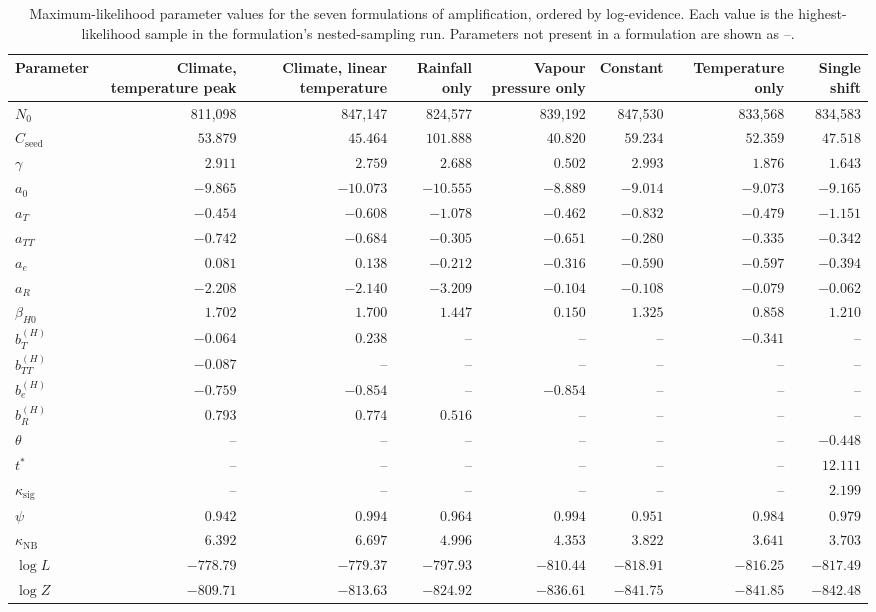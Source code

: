 \begin{table}[ht]
\centering
\scriptsize
\caption{Maximum-likelihood parameter values for the seven formulations of amplification, ordered by log-evidence. Each value is the highest-likelihood sample in the formulation's nested-sampling run. Parameters not present in a formulation are shown as --.}
\label{tab:si_best_fit_parameters}
\begin{tabular}{lrrrrrrr}
\toprule
Parameter & Climate, temperature peak & Climate, linear temperature & Rainfall only & Vapour pressure only & Constant & Temperature only & Single shift \\
\midrule
$N_0$ & 811,098 & 847,147 & 824,577 & 839,192 & 847,530 & 833,568 & 834,583 \\
$C_{\mathrm{seed}}$ & $53.879$ & $45.464$ & $101.888$ & $40.820$ & $59.234$ & $52.359$ & $47.518$ \\
$\gamma$ & $2.911$ & $2.759$ & $2.688$ & $0.502$ & $2.993$ & $1.876$ & $1.643$ \\
$a_0$ & $-9.865$ & $-10.073$ & $-10.555$ & $-8.889$ & $-9.014$ & $-9.073$ & $-9.165$ \\
$a_T$ & $-0.454$ & $-0.608$ & $-1.078$ & $-0.462$ & $-0.832$ & $-0.479$ & $-1.151$ \\
$a_{TT}$ & $-0.742$ & $-0.684$ & $-0.305$ & $-0.651$ & $-0.280$ & $-0.335$ & $-0.342$ \\
$a_e$ & $0.081$ & $0.138$ & $-0.212$ & $-0.316$ & $-0.590$ & $-0.597$ & $-0.394$ \\
$a_R$ & $-2.208$ & $-2.140$ & $-3.209$ & $-0.104$ & $-0.108$ & $-0.079$ & $-0.062$ \\
$\beta_{H0}$ & $1.702$ & $1.700$ & $1.447$ & $0.150$ & $1.325$ & $0.858$ & $1.210$ \\
$b_T^{(H)}$ & $-0.064$ & $0.238$ & -- & -- & -- & $-0.341$ & -- \\
$b_{TT}^{(H)}$ & $-0.087$ & -- & -- & -- & -- & -- & -- \\
$b_e^{(H)}$ & $-0.759$ & $-0.854$ & -- & $-0.854$ & -- & -- & -- \\
$b_R^{(H)}$ & $0.793$ & $0.774$ & $0.516$ & -- & -- & -- & -- \\
$\theta$ & -- & -- & -- & -- & -- & -- & $-0.448$ \\
$t^*$ & -- & -- & -- & -- & -- & -- & $12.111$ \\
$\kappa_{\mathrm{sig}}$ & -- & -- & -- & -- & -- & -- & $2.199$ \\
$\psi$ & $0.942$ & $0.994$ & $0.964$ & $0.994$ & $0.951$ & $0.984$ & $0.979$ \\
$\kappa_{\mathrm{NB}}$ & $6.392$ & $6.697$ & $4.996$ & $4.353$ & $3.822$ & $3.641$ & $3.703$ \\
\midrule
$\log L$ & $-778.79$ & $-779.37$ & $-797.93$ & $-810.44$ & $-818.91$ & $-816.25$ & $-817.49$ \\
$\log Z$ & $-809.71$ & $-813.63$ & $-824.92$ & $-836.61$ & $-841.75$ & $-841.85$ & $-842.48$ \\
\bottomrule
\end{tabular}
\end{table}
